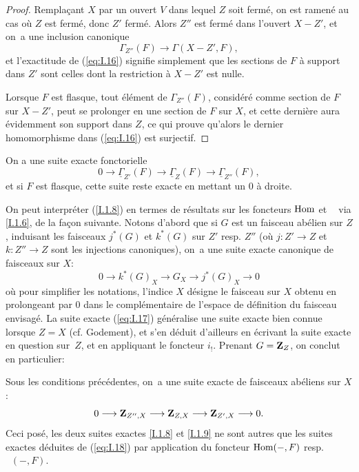 \begin{proof}
Rempla\c cant $X$ par un ouvert $V$ dans lequel $Z$ soit ferm\'e, on
est ramen\'e au cas o\`u $Z$ est ferm\'e, donc $Z'$ ferm\'e. Alors $Z''$
est ferm\'e dans l'ouvert $X-Z'$, et on~a une inclusion canonique
$$
\Gamma_{Z''}(F) \to \Gamma(X-Z', F),
$$
et l'exactitude de (\ref{eq:I.16}) signifie simplement que les sections de $F$ \`a support dans $Z'$ sont celles dont la restriction \`a $X-Z'$ est nulle.

Lorsque $F$ est flasque, tout \'el\'ement de $\Gamma_{Z''}(F)$, consid\'er\'e comme section de $F$ sur $X-Z'$, peut se prolonger en une section de $F$ sur $X$, et cette derni\`ere aura \'evidemment son support dans $Z$, ce qui prouve qu'alors le dernier homomorphisme dans (\ref{eq:I.16}) est surjectif.
\skipqed
\end{proof}

\begin{corollaire} \label{I.1.9} On a une suite exacte fonctorielle
\begin{equation*} \label{eq:I.16bis} \tag{16 bis} {0 \to \underline{\Gamma}_{Z'}(F) \to \underline{\Gamma}_Z(F) \to \underline{\Gamma}_{Z''}(F)},
\end{equation*}
et si $F$ est flasque, cette suite reste exacte en mettant un $0$ \`a droite.
\end{corollaire}

On peut interpr\'eter (\ref{I.1.8}) en termes de r\'esultats sur les
foncteurs $\operatorname{Hom}$ et $\mathop{\underline{\mathrm{Hom}}}\nolimits$ via \ref{I.1.6}, de la fa\c con
suivante. Notons d'abord que si $G$ est un faisceau ab\'elien sur
$Z$, induisant les faisceaux $j^*(G)$ et $k^*(G)$ sur $Z'$ resp.
$Z''$ (o\`u $j: Z' \to Z$ et $k: Z'' \to Z$ sont les injections
canoniques), on~a une suite exacte canonique de faisceaux sur $X$:
\begin{equation} \label{eq:I.17} {0 \to k^*(G)_X \to G_X \to j^*(G)_X \to 0}
\end{equation}
o\`u pour simplifier les notations, l'indice $X$ d\'esigne le faisceau sur $X$ obtenu en prolongeant par $0$ dans le compl\'ementaire de l'espace de d\'efinition du faisceau envisag\'e. La suite exacte (\ref{eq:I.17}) g\'en\'eralise une suite exacte bien connue lorsque $Z=X$ (cf. Godement), et s'en d\'eduit d'ailleurs en \'ecrivant la suite exacte en question sur~$Z$, et en appliquant le foncteur $i_!$. Prenant $G=\mathbf{Z}_{Z}$, on conclut en particulier:

\begin{proposition} \label{I.1.10}
Sous les conditions pr\'ec\'edentes, on~a une suite exacte de faisceaux ab\'eliens sur $X$:
\begin{equation} \label{eq:I.18} {0 \to \ZZ_{Z{''}, X} \to \ZZ_{Z, X} \to \ZZ_{Z', X} \to 0}.
\end{equation}
Ceci pos\'e, les deux suites exactes \ref{I.1.8} et \ref{I.1.9} ne sont autres que les suites exactes d\'eduites de (\ref{eq:I.18}) par application du foncteur $\operatorname{Hom}(-, F)$ resp. $\mathop{\underline{\mathrm{Hom}}}\nolimits(-, F)$.
\end{proposition}

